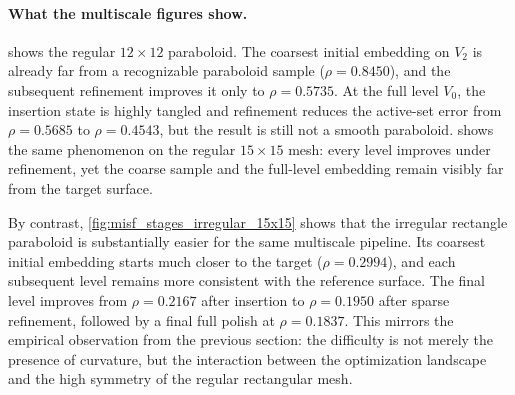 \documentclass[twoside,11pt]{article}
\begin{document}
\paragraph{What the multiscale figures show.}
 shows the regular $12\times 12$
paraboloid.  The coarsest initial embedding on $V_2$ is already far from a
recognizable paraboloid sample ($\rho = 0.8450$), and the subsequent
refinement improves it only to $\rho = 0.5735$.  At the full level $V_0$, the
insertion state is highly tangled and refinement reduces the active-set error
from $\rho = 0.5685$ to $\rho = 0.4543$, but the result is still not a smooth
paraboloid.   shows the same phenomenon on
the regular $15\times 15$ mesh: every level improves under refinement, yet the
coarse sample and the full-level embedding remain visibly far from the target
surface.

By contrast, \cref{fig:misf_stages_irregular_15x15} shows that the irregular
rectangle paraboloid is substantially easier for the same multiscale pipeline.
Its coarsest initial embedding starts much closer to the target
($\rho = 0.2994$), and each subsequent level remains more consistent with the
reference surface.  The final level improves from $\rho = 0.2167$ after
insertion to $\rho = 0.1950$ after sparse refinement, followed by a final full
polish at $\rho = 0.1837$.  This mirrors the empirical observation from the
previous section: the difficulty is not merely the presence of curvature, but
the interaction between the optimization landscape and the high symmetry of the
regular rectangular mesh.
\end{document}
